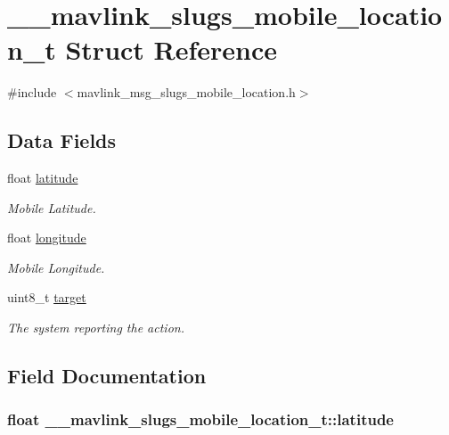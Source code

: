 \hypertarget{struct____mavlink__slugs__mobile__location__t}{\section{\+\_\+\+\_\+mavlink\+\_\+slugs\+\_\+mobile\+\_\+location\+\_\+t Struct Reference}
\label{struct____mavlink__slugs__mobile__location__t}
}


{\ttfamily \#include $<$mavlink\+\_\+msg\+\_\+slugs\+\_\+mobile\+\_\+location.\+h$>$}

\subsection*{Data Fields}
\begin{DoxyCompactItemize}
\item 
float \hyperlink{struct____mavlink__slugs__mobile__location__t_a6dbfa280c5db93810a9022a6dc4bbd01}{latitude}
\begin{DoxyCompactList}\small\item\em Mobile Latitude. \end{DoxyCompactList}\item 
float \hyperlink{struct____mavlink__slugs__mobile__location__t_aa5183cef5c8d7755018562561ad0c677}{longitude}
\begin{DoxyCompactList}\small\item\em Mobile Longitude. \end{DoxyCompactList}\item 
uint8\+\_\+t \hyperlink{struct____mavlink__slugs__mobile__location__t_ad256cecd775dec71273242e31a7de962}{target}
\begin{DoxyCompactList}\small\item\em The system reporting the action. \end{DoxyCompactList}\end{DoxyCompactItemize}


\subsection{Field Documentation}
\hypertarget{struct____mavlink__slugs__mobile__location__t_a6dbfa280c5db93810a9022a6dc4bbd01}{
\subsubsection[{latitude}]{\setlength{\rightskip}{0pt plus 5cm}float \+\_\+\+\_\+mavlink\+\_\+slugs\+\_\+mobile\+\_\+location\+\_\+t\+::latitude}}\label{struct____mavlink__slugs__mobile__location__t_a6dbfa280c5db93810a9022a6dc4bbd01}


